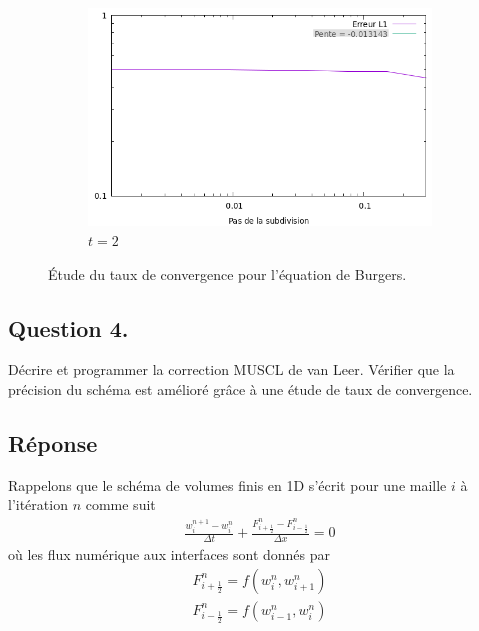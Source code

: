 \documentclass[
	french,
	11pt, %
]{fphw}
\begin{document}
\begin{figure}[H]
\begin{subfigure}{0.32\textwidth}
		\centering
		\includegraphics[width=\textwidth]{BurgersConv3.png}
		\caption{$t=2$}
		\label{fig:BurgersFaux4}
\end{subfigure}
	\caption{Étude du taux de convergence pour l'équation de Burgers.}
	\label{fig:BurgersConv}
\end{figure}


\subsection*{Question 4.}
\begin{problem}
	Décrire et programmer la correction MUSCL de van Leer. Vérifier que la précision du schéma est amélioré grâce à une étude de taux de convergence.
\end{problem}

\subsection*{Réponse}


\renewcommand{\sfrac}{\frac}

Rappelons que le schéma de volumes finis en 1D s'écrit pour une maille $i$ à l'itération $n$ comme suit 
\begin{align}
	\label{eq:num1d}
	\frac{w^{n+1}_i - w^n_i}{\Delta t} +  \frac{F^n_{i+\sfrac{1}{2}} - F^n_{i-\sfrac{1}{2}}}{\Delta x} = 0
\end{align}
où les flux numérique aux interfaces sont donnés par 
\begin{align*}
	F^n_{i+\sfrac{1}{2}} = f(w^{n}_{i}, w^{n}_{i+1}) \\
	F^n_{i-\sfrac{1}{2}} = f(w^{n}_{i-1}, w^{n}_{i})
\end{align*}
\end{document}
